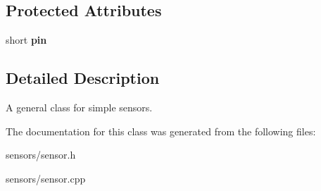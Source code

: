 \subsection*{Protected Attributes}
\begin{DoxyCompactItemize}
\item 
\mbox{\label{classsensor_a4fb74b2b7aedb1554825444387c0d017}} 
short {\bfseries pin}
\end{DoxyCompactItemize}


\subsection{Detailed Description}
A general class for simple sensors. 

The documentation for this class was generated from the following files\+:\begin{DoxyCompactItemize}
\item 
sensors/sensor.\+h\item 
sensors/sensor.\+cpp\end{DoxyCompactItemize}
